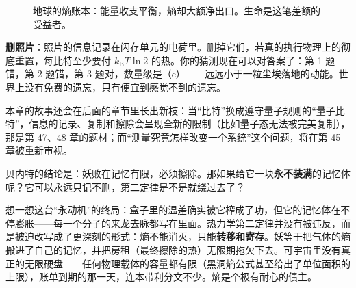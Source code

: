 \begin{figure}[htbp]
\centering
{}
\caption{地球的熵账本：能量收支平衡，熵却大额净出口。生命是这笔差额的受益者。}
\end{figure}

\textbf{删照片}：照片的信息记录在闪存单元的电荷里。删掉它们，若真的执行物理上的彻底重置，每比特至少要付 $k_{\mathrm{B}}T\ln2$ 的热。你的猜测现在可以对答案了：第 1 题错，第 2 题错，第 3 题对，数量级是（c）——远远小于一粒尘埃落地的动能。世界上没有免费的遗忘，只有便宜到感觉不到的遗忘。


本章的故事还会在后面的章节里长出新枝：当“比特”换成遵守量子规则的“量子比特”，信息的记录、复制和擦除会呈现全新的限制（比如量子态无法被完美复制），那是第 47、48 章的题材；而“测量究竟怎样改变一个系统”这个问题，将在第 45 章被重新审视。

\begin{thought}[给妖配一块无限大的硬盘]
贝内特的结论是：妖败在记忆有限，必须擦除。那如果给它一块\textbf{永不装满}的记忆体呢？它可以永远只记不删，第二定律是不是就绕过去了？

想一想这台“永动机”的终局：盒子里的温差确实被它榨成了功，但它的记忆体在不停膨胀——每一个分子的来龙去脉都写在里面。热力学第二定律并没有被违反，而是被迫改写成了更深刻的形式：熵不能消灭，只能\textbf{转移和寄存}。妖等于把气体的熵搬进了自己的记忆，并把房租（最终擦除的热）无限期拖欠下去。可宇宙里没有真正的无限硬盘——任何物理载体的容量都有限（黑洞熵公式甚至给出了单位面积的上限），账单到期的那一天，连本带利分文不少。熵是个极有耐心的债主。
\end{thought}

